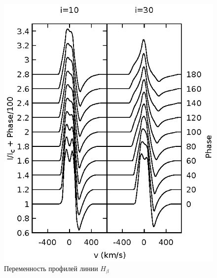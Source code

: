 \documentclass{article}
\begin{document}
\begin{figure} [!htb]
 	\centering
    \includegraphics[width=1.0\textwidth]{rot_all_10_30}
    \caption{Переменность профилей линии $H_\beta$}
\end{figure}
\end{document}
